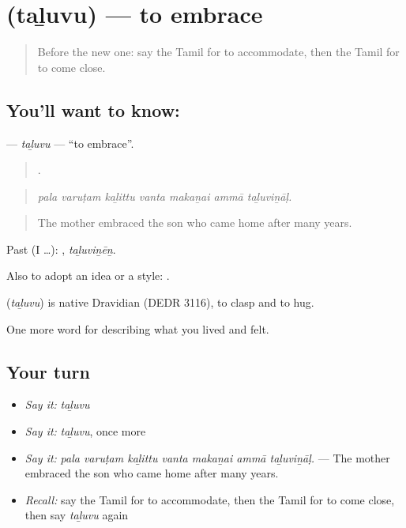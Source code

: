 \section[\texorpdfstring{\ta{தழுவு} (taḻuvu)}{தழுவு (taḻuvu)}]{ (taḻuvu) — to embrace}

\label{lesson:TA-C502-taluvu}



\begin{quote}
Before the new one: say the Tamil for to accommodate, then the Tamil for to come close.
\end{quote}

\subsection*{You'll want to know: }
\textbf{} — \emph{taḻuvu} — \textquotedblleft{}to embrace\textquotedblright{}.

\begin{quote}
      .
\end{quote}

\begin{quote}
\emph{pala varuṭam kaḻittu vanta makaṉai ammā taḻuviṉāḷ.}
\end{quote}

\begin{quote}
The mother embraced the son who came home after many years.
\end{quote}

Past (I …): , \emph{taḻuviṉēṉ}.

Also to adopt an idea or a style:   .

\begin{cousinweb}
\textbf{} (\emph{taḻuvu}) is native Dravidian (DEDR 3116), to clasp and to hug.
\end{cousinweb}

\begin{grammarlens}[title={What you've built}]
One more word for describing what you lived and felt.
\end{grammarlens}

\subsection*{Your turn}
\begin{itemize}
\raggedright
  \item \emph{Say it:} \emph{taḻuvu}
  \item \emph{Say it:} \emph{taḻuvu}, once more
  \item \emph{Say it:} \emph{pala varuṭam kaḻittu vanta makaṉai ammā taḻuviṉāḷ.} — The mother embraced the son who came home after many years.
  \item \emph{Recall:} say the Tamil for to accommodate, then the Tamil for to come close, then say \emph{taḻuvu} again
\end{itemize}

